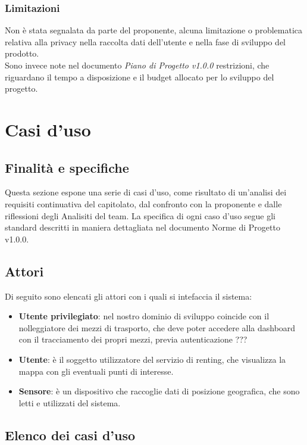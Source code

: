 \documentclass[11pt]{article}
\begin{document}
\begin{justify}
\subsubsection{Limitazioni}
Non è stata segnalata da parte del proponente, alcuna limitazione o problematica relativa alla privacy nella raccolta dati dell'utente e nella fase di sviluppo del prodotto.
\\
Sono invece note nel documento \textit{Piano di Progetto v1.0.0} restrizioni, che riguardano il tempo a disposizione e il budget allocato per lo sviluppo del progetto. 
\newpage
\section{Casi d'uso}
\subsection{Finalità e specifiche}
Questa sezione espone una serie di casi d'uso, come risultato di un'analisi dei requisiti continuativa del capitolato, dal confronto con la proponente e dalle riflessioni degli Analisiti del team. La specifica di ogni caso d'uso segue gli standard descritti in maniera dettagliata nel documento Norme di Progetto v1.0.0.

\subsection{Attori}
Di seguito sono elencati gli attori con i quali si intefaccia il sistema:
\begin{itemize}
    \item \textbf{Utente privilegiato}: nel nostro dominio di sviluppo coincide con il nolleggiatore dei mezzi di trasporto, che deve poter accedere alla dashboard con il tracciamento dei propri mezzi, previa autenticazione ???
    \item \textbf{Utente}: è il soggetto utilizzatore del servizio di renting, che visualizza la mappa con gli eventuali punti di interesse.
    \item \textbf{Sensore}: è un dispositivo che raccoglie dati di posizione geografica, che sono letti e utilizzati del sistema.
\end{itemize}
\subsection{Elenco dei casi d'uso}

\end{justify}
\end{document}
